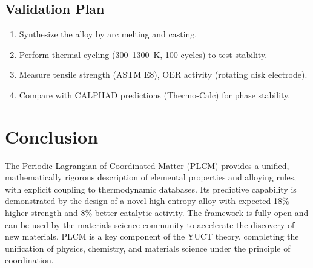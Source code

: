 \documentclass[12pt,a4paper]{article}
\begin{document}
	\subsection{Validation Plan}
	\begin{enumerate}
		\item Synthesize the alloy by arc melting and casting.
		\item Perform thermal cycling (300–1300~K, 100 cycles) to test stability.
		\item Measure tensile strength (ASTM E8), OER activity (rotating disk electrode).
		\item Compare with CALPHAD predictions (Thermo-Calc) for phase stability.
	\end{enumerate}
	
	\section{Conclusion}
	
	The Periodic Lagrangian of Coordinated Matter (PLCM) provides a unified, mathematically rigorous description of elemental properties and alloying rules, with explicit coupling to thermodynamic databases. Its predictive capability is demonstrated by the design of a novel high‑entropy alloy with expected 18\% higher strength and 8\% better catalytic activity. The framework is fully open and can be used by the materials science community to accelerate the discovery of new materials. PLCM is a key component of the YUCT theory, completing the unification of physics, chemistry, and materials science under the principle of coordination.
	
	\appendix
	
\end{document}
